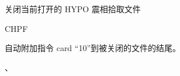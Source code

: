 \label{cmd:chpf}

关闭当前打开的 HYPO 震相拾取文件

\begin{SACSTX}
CHPF
\end{SACSTX}

自动附加指令 card ``10''到被关闭的文件的结尾。

、

